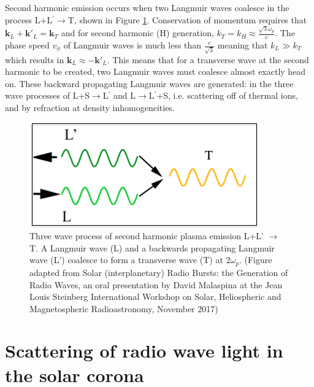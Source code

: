 Second harmonic emission occurs when two Langmuir waves coalesce in the process L+L$^\prime \rightarrow$T, shown in Figure \ref{fig:Hemission}. Conservation of momentum requires that $\mathbf{k}_L + \mathbf{k'}_L = \mathbf{k}_T$ and for second harmonic (H) generation, $k_T=k_H \approx \frac{\sqrt{3} \omega_p}{c}$. The phase speed $v_\phi$ of Langmuir waves is much less than $\frac{c}{\sqrt{3}}$ meaning that $k_L \gg k_T$ which results in $\mathbf{k}_L \approx -\mathbf{k'}_L$. This means that for a transverse wave at the second harmonic to be created, two Langmuir waves must coalesce almost exactly head on. These backward propagating Langmuir waves are generated: in the three wave processes of L+S$\rightarrow$L$^\prime$ and L$\rightarrow$L$^\prime$+S, i.e. scattering off of thermal ions, and by refraction at density inhomogeneities.
 \begin{figure}[ht]

     \centering
     \includegraphics[width=0.5\columnwidth]{Images/Harmonic_emission_Lwaves.png}
     \caption[Three wave process of second harmonic plasma emission L+L' $\rightarrow$ T.]{Three wave process of second harmonic plasma emission L+L' $\rightarrow$ T. A Langmuir wave (L) and a backwards propagating Langmuir wave (L') coalesce to form a transverse wave (T) at $2 \omega_p$. (Figure adapted from Solar (interplanetary) Radio Bursts: the Generation of Radio Waves,	an oral presentation by David Malaspina at the Jean Louis Steinberg International Workshop on Solar, Heliospheric and Magnetospheric Radioastronomy, November 2017)}
     \label{fig:Hemission}
 \end{figure}
 
\section{Scattering of radio wave light in the solar corona}
\label{sec:scattering_theory}

